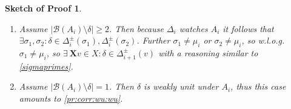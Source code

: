 \documentclass{vutinfth} %
\newtheorem{proof-sketch}{Sketch of Proof}[chapter]
\newcommand{\bass}{\mathcal{B}}
\newcommand{\bX}{\mathbf{X}}
\newcommand{\sgl}{\mu}
\newcommand{\bsgl}{\sigma}
\begin{document}
\begin{proof-sketch}
\begin{enumerate}
\begin{enumerate}
\begin{enumerate}
\item Assume $|\bass(A_i) \setminus \delta| \geq 2$. Then because $\Delta_i$ watches $A_i$ it follows that $\exists \bsgl_1, \bsgl_2 : \delta \in \Delta_i^\pm(\bsgl_1), \Delta_i^\pm(\bsgl_2)$. Further $\bsgl_1 \not = \sgl_i$ or $\bsgl_2 \not = \sgl_i$, so w.l.o.g.~$\bsgl_1 \not = \sgl_i$, so $\exists \ {\bX v} \in X : \delta \in \Delta_{i+1}^\pm(v)$ with a reasoning similar to \ref{sigmaprimes}.

\item Assume $|\bass(A_i) \setminus \delta| = 1$. Then $\delta$ is weakly unit under $A_i$, thus this case amounts to \ref{pr:corr:wu:wu}.
\end{enumerate}

\end{enumerate}

\end{enumerate}


\end{proof-sketch}
\end{document}
